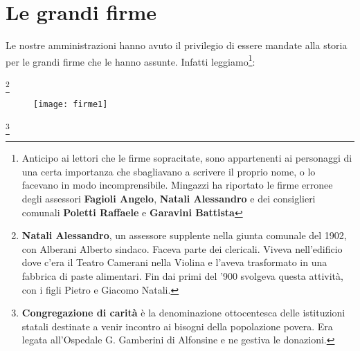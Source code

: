 
\chapter{Le grandi firme}
Le nostre amministrazioni hanno avuto il privilegio di essere mandate alla storia per le grandi firme che le hanno assunte.
Infatti leggiamo\footnote{Anticipo ai lettori che le firme sopracitate, sono appartenenti ai personaggi di una certa importanza che sbagliavano a scrivere il proprio nome, o lo facevano in modo incomprensibile. Mingazzi ha riportato le firme erronee degli assessori \textbf{Fagioli Angelo}, \textbf{Natali Alessandro} e dei consiglieri comunali \textbf{Poletti Raffaele} e \textbf{Garavini Battista}}:

\begin{center}
	\Huge
	\normalsize
	\footnote{\textbf{Natali Alessandro}, un assessore supplente nella giunta comunale del 1902, con Alberani Alberto sindaco. Faceva parte dei clericali. Viveva nell'edificio dove c'era il Teatro Camerani nella Violina e l'aveva trasformato in una fabbrica di paste alimentari. Fin dai primi del '900 svolgeva questa attività, con i figli Pietro e Giacomo Natali.}
\end{center}
	
 \begin{figure}[htb]
    \vspace{-0.75cm}
    \texttt{[image: firme1]}
    \caption[Firme]{\label{fig:firme1}}
    \vspace{-1cm}
\end{figure}

\begin{center}
	\Huge
	\normalfont
	\normalsize
	\footnote{\textbf{Congregazione di carità} è la denominazione ottocentesca delle istituzioni statali destinate a venir incontro ai bisogni della popolazione povera. Era legata all'Ospedale G. Gamberini di Alfonsine e ne gestiva le donazioni.}
\end{center}

